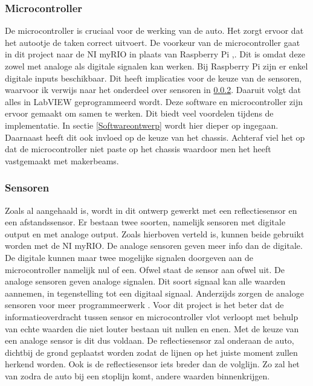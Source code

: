 \documentclass[a4paper,twoside,kulak]{kulakreport} %
\begin{document}
\subsubsection{Microcontroller}
De microcontroller is cruciaal voor de werking van de auto. Het zorgt ervoor dat het autootje de taken correct uitvoert. De voorkeur van de microcontroller gaat in dit project naar de NI myRIO in plaats van Raspberry Pi \cite{nimyrio},\cite{RaspberryPi}.
Dit is omdat deze zowel met analoge als digitale signalen kan werken. 
Bij Raspberry Pi zijn er enkel digitale inputs beschikbaar. Dit heeft implicaties voor de keuze van de sensoren, waarvoor ik verwijs naar het onderdeel over sensoren in \ref{Sensoren}.
Daaruit volgt dat alles in LabVIEW geprogrammeerd wordt.
Deze software en microcontroller zijn ervoor gemaakt om samen te werken. Dit biedt veel voordelen tijdens de implementatie. In sectie \ref{Softwareontwerp} wordt hier dieper op ingegaan. %
Daarnaast heeft dit ook invloed op de keuze van het chassis. Achteraf viel het op dat de microcontroller niet paste op het chassis waardoor men het heeft vastgemaakt met makerbeams.

\label{Microcontroller}

\subsubsection{Sensoren} \label{Sensoren}
Zoals al aangehaald is, wordt in dit ontwerp gewerkt met een reflectiesensor en een afstandssensor. Er bestaan twee soorten, namelijk sensoren met digitale output en met analoge output. Zoals hierboven verteld is, kunnen beide gebruikt worden met de NI myRIO. De analoge sensoren geven meer info dan de digitale. De digitale kunnen maar twee mogelijke signalen doorgeven aan de microcontroller namelijk nul of een. Ofwel staat de sensor aan ofwel uit. De analoge sensoren geven analoge signalen. Dit soort signaal kan alle waarden aannemen, in tegenstelling tot een digitaal signaal. Anderzijds zorgen de analoge sensoren voor meer programmeerwerk \cite{DigitaalOfAnaloog}. Voor dit project is het beter dat de informatieoverdracht tussen sensor en microcontroller vlot verloopt met behulp van echte waarden die niet louter bestaan uit nullen en enen. Met de keuze van een analoge sensor is dit dus voldaan. %
De reflectiesensor zal onderaan de auto, dichtbij de grond geplaatst worden zodat de lijnen op het juiste moment zullen herkend worden. Ook is de reflectiesensor iets breder dan de volglijn. Zo zal het van zodra de auto bij een stoplijn komt, andere waarden binnenkrijgen.
\end{document}
